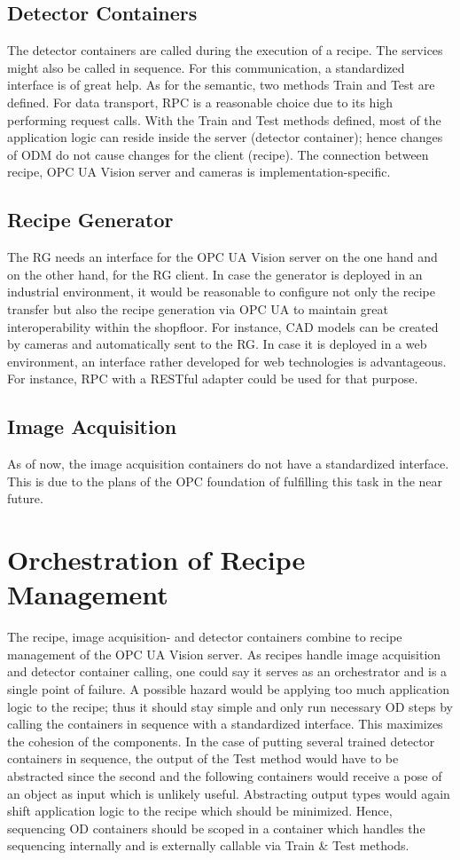 \subsection{Detector Containers}
The detector containers are called during the execution of a recipe. The services might also be called in sequence. For this communication, a standardized interface is of great help. As for the semantic, two methods Train and Test are defined. For data transport, RPC is a reasonable choice due to its high performing request calls. With the Train and Test methods defined, most of the application logic can reside inside the server (detector container); hence changes of ODM do not cause changes for the client (recipe). The connection between recipe, OPC UA Vision server and cameras is implementation-specific.

\subsection{Recipe Generator}
The RG needs an interface for the OPC UA Vision server on the one hand and on the other hand, for the RG client. In case the generator is deployed in an industrial environment, it would be reasonable to configure not only the recipe transfer but also the recipe generation via OPC UA to maintain great interoperability within the shopfloor. For instance, CAD models can be created by cameras and automatically sent to the RG. In case it is deployed in a web environment, an interface rather developed for web technologies is advantageous. For instance, RPC with a RESTful adapter could be used for that purpose.

\subsection{Image Acquisition}
As of now, the image acquisition containers do not have a standardized interface. This is due to the plans of the OPC foundation of fulfilling this task in the near future.

\section{Orchestration of Recipe Management}
The recipe, image acquisition- and  detector containers combine to recipe management of the OPC UA Vision server. As recipes handle image acquisition and detector container calling, one could say it serves as an orchestrator and is a single point of failure. A possible hazard would be applying too much application logic to the recipe; thus it should stay simple and only run necessary OD steps by calling the containers in sequence with a standardized interface. This maximizes the cohesion of the components. In the case of putting several trained detector containers in sequence, the output of the Test method would have to be abstracted since the second and the following containers would receive a pose of an object as input which is unlikely useful. Abstracting output types would again shift application logic to the recipe which should be minimized. Hence, sequencing OD containers should be scoped in a container which handles the sequencing internally and is externally callable via Train \& Test methods.
